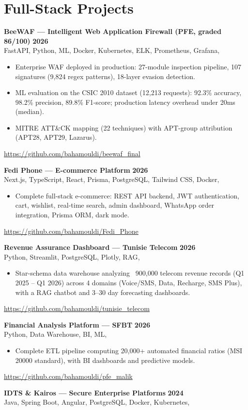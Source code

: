 \documentclass[a4paper,10pt]{article}
\newcommand{\cventry}[4]{\textbf{#1} \hfill \textbf{#4}\\[1pt]#2{\ifx\relax#3\relax\else, #3\fi}\par\vspace{2pt}}
\newcommand{\repolink}[1]{{\small\href{#1}{#1}}\par\vspace{1pt}}
\begin{document}
\section{Full-Stack Projects}
\cventry{BeeWAF --- Intelligent Web Application Firewall (PFE, graded 86/100)}{FastAPI, Python, ML, Docker, Kubernetes, ELK, Prometheus, Grafana}{}{2026}
\begin{itemize}
  \item Enterprise WAF deployed in production: 27-module inspection pipeline, 107 signatures (9,824 regex patterns), 18-layer evasion detection.
  \item ML evaluation on the CSIC 2010 dataset (12,213 requests): 92.3\% accuracy, 98.2\% precision, 89.8\% F1-score; production latency overhead under 20ms (median).
  \item MITRE ATT\&CK mapping (22 techniques) with APT-group attribution (APT28, APT29, Lazarus).
\end{itemize}
\repolink{https://github.com/bahamouldi/beewaf\_final}
\cventry{Fedi Phone --- E-commerce Platform}{Next.js, TypeScript, React, Prisma, PostgreSQL, Tailwind CSS, Docker}{}{2026}
\begin{itemize}
  \item Complete full-stack e-commerce: REST API backend, JWT authentication, cart, wishlist, real-time search, admin dashboard, WhatsApp order integration, Prisma ORM, dark mode.
\end{itemize}
\repolink{https://github.com/bahamouldi/Fedi\_Phone}
\cventry{Revenue Assurance Dashboard --- Tunisie Telecom}{Python, Streamlit, PostgreSQL, Plotly, RAG}{}{2026}
\begin{itemize}
  \item Star-schema data warehouse analyzing ~900,000 telecom revenue records (Q1 2025 -- Q1 2026) across 4 domains (Voice/SMS, Data, Recharge, SMS Plus), with a RAG chatbot and 3--30 day forecasting dashboards.
\end{itemize}
\repolink{https://github.com/bahamouldi/tunisie\_telecom}
\cventry{Financial Analysis Platform --- SFBT}{Python, Data Warehouse, BI, ML}{}{2026}
\begin{itemize}
  \item Complete ETL pipeline computing 20,000+ automated financial ratios (MSI 20000 standard), with BI dashboards and predictive models.
\end{itemize}
\repolink{https://github.com/bahamouldi/pfe\_malik}
\cventry{IDTS \& Kairos --- Secure Enterprise Platforms}{Java, Spring Boot, Angular, PostgreSQL, Docker, Kubernetes}{}{2024}
\end{document}
